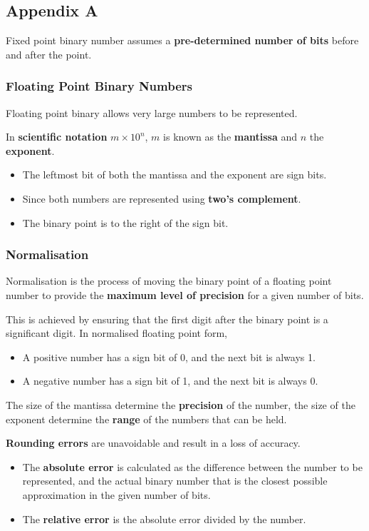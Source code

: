 \subsection*{Appendix A}

Fixed point binary number assumes a \textbf{pre-determined number of bits} before and after the point.

\subsubsection*{Floating Point Binary Numbers}

Floating point binary allows very large numbers to be represented.

In \textbf{scientific notation} $m\times 10^n$, $m$ is known as the \textbf{mantissa} and $n$ the \textbf{exponent}.
\begin{itemize}
    \item The leftmost bit of both the mantissa and the exponent are sign bits.
    \item Since both numbers are represented using \textbf{two's complement}.
    \item The binary point is to the right of the sign bit.
\end{itemize}

\subsubsection*{Normalisation}

Normalisation is the process of moving the binary point of a floating point number to provide the \textbf{maximum level of precision} for a given number of bits.

This is achieved by ensuring that the first digit after the binary point is a significant digit. In normalised floating point form,
\begin{itemize}
    \item A positive number has a sign bit of 0, and the next bit is always 1.
    \item A negative number has a sign bit of 1, and the next bit is always 0.
\end{itemize}

The size of the mantissa determine the \textbf{precision} of the number, the size of the exponent determine the \textbf{range} of the numbers that can be held.

\textbf{Rounding errors} are unavoidable and result in a loss of accuracy.
\begin{itemize}
    \item The \textbf{absolute error} is calculated as the difference between the number to be represented, and the actual binary number that is the closest possible approximation in the given number of bits.
    \item The \textbf{relative error} is the absolute error divided by the number.
\end{itemize}

